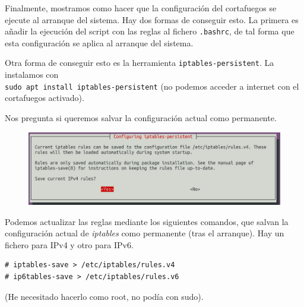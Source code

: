 \documentclass{article}
\begin{document}
Finalmente, mostramos como hacer que la configuración del cortafuegos se ejecute al arranque del sistema.
Hay dos formas de conseguir esto. La primera es añadir la ejecución del script con las reglas al fichero
\texttt{.bashrc}, de tal forma que esta configuración se aplica al arranque del sistema.

Otra forma de conseguir esto es la herramienta \texttt{iptables-persistent}. La instalamos con \\
\verb^sudo apt install iptables-persistent^ (no podemos acceder a internet con el cortafuegos activado).

Nos pregunta si queremos salvar la configuración actual como permanente.

\begin{figure}[H]
	\centering
	\includegraphics[width=160mm]{imgs/iptables-persistent}
	\label{fig:iptables-persistent}
\end{figure}

Podemos actualizar las reglas mediante los siguientes comandos, que salvan la
configuración actual de \emph{iptables} como permanente (tras el arranque). Hay un fichero para IPv4 y otro
para IPv6.
\begin{Verbatim}
# iptables-save > /etc/iptables/rules.v4
# ip6tables-save > /etc/iptables/rules.v6
\end{Verbatim}
(He necesitado hacerlo como root, no podía con sudo).
\end{document}
